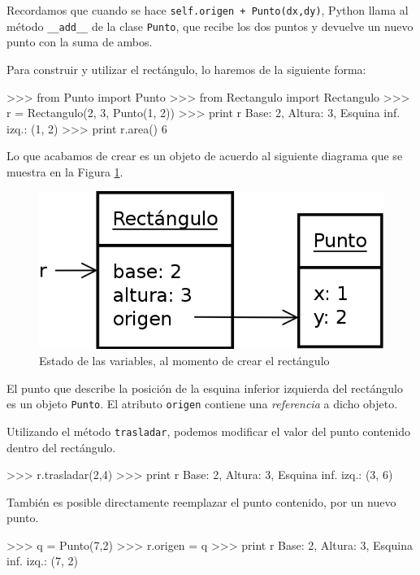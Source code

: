 Recordamos que cuando se hace \lstinline!self.origen + Punto(dx,dy)!,
Python llama al método \lstinline!__add__! de la clase \lstinline!Punto!,
que recibe los dos puntos y devuelve un nuevo punto con la suma de ambos.

Para construir y utilizar el rectángulo, lo haremos de la siguiente forma:

\begin{codigo-python-sn}
>>> from Punto import Punto
>>> from Rectangulo import Rectangulo
>>> r = Rectangulo(2, 3, Punto(1, 2))
>>> print r
Base: 2, Altura: 3, Esquina inf. izq.: (1, 2)
>>> print r.area()
6
\end{codigo-python-sn}

Lo que acabamos de crear es un objeto de acuerdo al siguiente diagrama que
se muestra en la Figura \ref{rectangulo_punto}.

\begin{figure}[htb]
\label{rectangulo_punto}
\includegraphics{graficos/15_Rectangulo_Punto}
\caption{Estado de las variables, al momento de crear el rectángulo}
\end{figure}

El punto que describe la posición de la esquina inferior izquierda del
rectángulo es un objeto \lstinline!Punto!. El atributo \lstinline!origen!
contiene una {\it referencia} a dicho objeto.

Utilizando el método \lstinline!trasladar!, podemos modificar el valor del
punto contenido dentro del rectángulo.

\begin{codigo-python-sn}
>>> r.trasladar(2,4)
>>> print r
Base: 2, Altura: 3, Esquina inf. izq.: (3, 6)
\end{codigo-python-sn}

También es posible directamente reemplazar el punto contenido, por un nuevo
punto.

\begin{codigo-python-sn}
>>> q = Punto(7,2)
>>> r.origen = q
>>> print r
Base: 2, Altura: 3, Esquina inf. izq.: (7, 2)
\end{codigo-python-sn}

